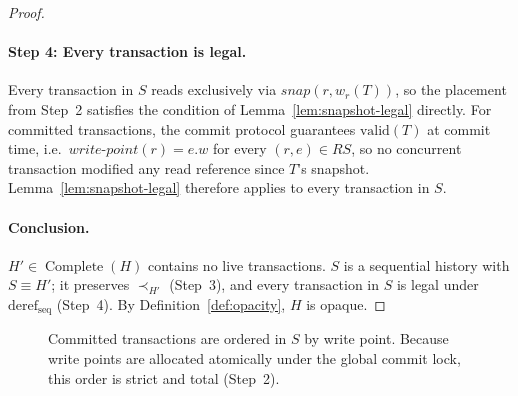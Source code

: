 \begin{proof}
  \paragraph{Step 4: Every transaction is legal.}
  Every transaction in $S$ reads exclusively via $\mathit{snap}(r,w_r(T))$,
  so the placement from Step~2 satisfies the condition of
  Lemma~\ref{lem:snapshot-legal} directly. For committed transactions, the
  commit protocol guarantees $\text{valid}(T)$ at commit time, i.e.\
  $\mathit{write\text{-}point}(r) = e.w$ for every $(r,e) \in RS$, so no
  concurrent transaction modified any read reference since $T$'s snapshot.
  Lemma~\ref{lem:snapshot-legal} therefore applies to every transaction in $S$.

  \paragraph{Conclusion.}
  $H' \in \operatorname{Complete}(H)$ contains no live transactions. $S$ is a
  sequential history with $S \equiv H'$; it preserves $\prec_{H'}$ (Step~3),
  and every transaction in $S$ is legal under $\text{deref}_{\mathrm{seq}}$
  (Step~4). By Definition~\ref{def:opacity}, $H$ is opaque.
\end{proof}

\begin{figure}[ht]
  \centering
  \caption{Committed transactions are ordered in $S$ by write point. Because
    write points are allocated atomically under the global commit lock, this
    order is strict and total (Step~2).}
  \label{fig:wc-ordering}
\end{figure}

